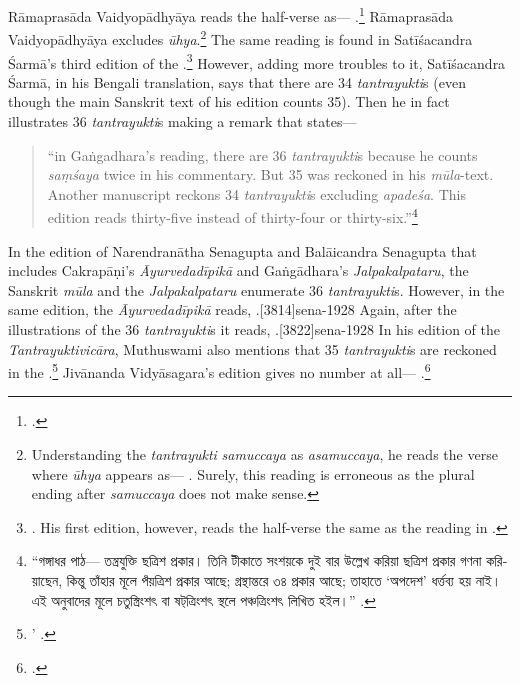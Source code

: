 Rāmaprasāda Vaidyopādhyāya reads the half-verse as---
.\footnote{\cite[1913]{vaid-1911}.} Rāmaprasāda
    Vaidyopādhyāya excludes \emph{ūhya}.\footnote{Understanding the
        \emph{tantrayukti} \emph{samuccaya} as \emph{asamuccaya}, he reads
        the verse where \emph{ūhya} appears as--- . Surely, this reading is erroneous as the
        plural ending after \emph{samuccaya} does not make sense.} The same
        reading is found in Satīśacandra Śarmā's third edition of the
        \CS.\footnote{\cite[1020]{sarm-1923}. His first edition, however,
            reads the half-verse the same as the reading in
            \cite{cara-trikamji}.\parencite[884]{sarm-1904}} However, adding more
            troubles to it, Satīśacandra Śarmā, in his Bengali translation, says
            that there are 34 \emph{tantrayukti}s (even though the main Sanskrit
            text of his edition counts 35). Then he in fact illustrates 36
            \emph{tantrayukti}s making a remark that states---

\begin{quote}
	
 “in Gaṅgadhara's reading, there are 36 \emph{tantrayukti}s because he 
counts \emph{saṃśaya} twice in his commentary. But 35 was reckoned in his 
\emph{mūla}-text. Another manuscript reckons 34 \emph{tantrayukti}s 
excluding 
\emph{apadeśa}. This edition reads thirty-five instead of thirty-four or 
thirty-six.”\footnote{\textbengali{“গঙ্গাধর পাঠ— তন্ত্রযুক্তি ছত্রিশ প্রকার। তিনি টীকাতে সংশয়কে 
দুই বার উল্লেখ করিয়া ছত্রিশ প্রকার গণনা করিয়াছেন, কিন্তু তাঁহার মূলে পঁয়ত্রিশ প্রকার আছে; গ্রন্থান্তরে ৩৪ 
প্রকার আছে; তাহাতে ‘অপদেশ’ ধর্ত্তব্য হয় নাই। এই অনুবাদের মূলে চতুস্ত্রিংশৎ বা ষট্‌ত্রিংশৎ স্থলে 
পঞ্চত্রিংশৎ লিখিত হইল।”} \cite[1022]{sarm-1923}.}
	
\end{quote}

 
In the edition of Narendranātha Senagupta and Balāicandra Senagupta
that includes Cakrapāṇi's \emph{Āyurvedadīpikā} and Gaṅgādhara's
\emph{Jalpakalpataru}, the Sanskrit \emph{mūla} and the
\emph{Jalpakalpataru} enumerate 36 \emph{tantrayukti}s. However, in
the same edition, the \emph{Āyurvedadīpikā} reads,
.[3814]{sena-1928} Again, after the illustrations
of the 36 \emph{tantrayukti}s it reads, .[3822]{sena-1928} In his edition of the
\emph{Tantrayuktivicāra}, Muthuswami also mentions that 35
\emph{tantrayukti}s are reckoned in the
\CS.\footnote{’ \parencite[2, fn.\,2]{muth-1976}.} Jivānanda Vidyāsagara's
edition gives no number at all--- .\footcite[961]{bhat-1877}

